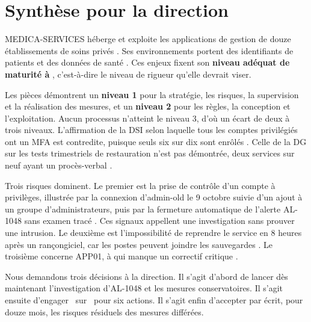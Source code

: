 \section*{Synthèse pour la direction}

MEDICA-SERVICES héberge et exploite les applications de gestion de douze établissements de soins privés . Ses environnements portent des identifiants de patients et des données de santé . Ces enjeux fixent son \textbf{niveau adéquat de maturité à \Cible}, c'est-à-dire le niveau de rigueur qu'elle devrait viser.

Les pièces démontrent un \textbf{niveau 1} pour la stratégie, les risques, la supervision et la réalisation des mesures, et un \textbf{niveau 2} pour les règles, la conception et l'exploitation. Aucun processus n'atteint le niveau 3, d'où un écart de deux à trois niveaux. L'affirmation de la DSI selon laquelle tous les comptes privilégiés ont un MFA est contredite, puisque seuls six sur dix sont enrôlés . Celle de la DG sur les tests trimestriels de restauration n'est pas démontrée, deux services sur neuf ayant un procès-verbal .

Trois risques dominent. Le premier est la prise de contrôle d'un compte à privilèges, illustrée par la connexion d'admin-old le 9 octobre suivie d'un ajout à un groupe d'administrateurs, puis par la fermeture automatique de l'alerte AL-1048 sans examen tracé . Ces signaux appellent une investigation sans prouver une intrusion. Le deuxième est l'impossibilité de reprendre le service en 8 heures après un rançongiciel, car les postes peuvent joindre les sauvegardes . Le troisième concerne APP01, à qui manque un correctif critique .

Nous demandons trois décisions à la direction. Il s'agit d'abord de lancer dès maintenant l'investigation d'AL-1048 et les mesures conservatoires. Il s'agit ensuite d'engager \TotalRetenu\ sur \Plafond\ pour six actions. Il s'agit enfin d'accepter par écrit, pour douze mois, les risques résiduels des mesures différées.
